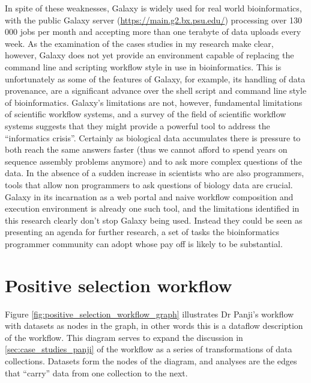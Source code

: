 \documentclass[a4paper,10pt]{scrreprt} \usepackage[utf8]{inputenc}
\begin{document}
In spite of these weaknesses, Galaxy is widely used for real world bioinformatics, with the public Galaxy server (\url{https://main.g2.bx.psu.edu/}) processing over 130 000 jobs per month and accepting more than one terabyte of data uploads every week. \cite{nekrutenko_introduction_2011} As the examination of the cases studies in my research make clear, however, Galaxy does not yet provide an environment capable of replacing the command line and scripting workflow style in use in bioinformatics. This is unfortunately as some of the features of Galaxy, for example, its handling of data provenance, are a significant advance over the shell script and command line style of bioinformatics. Galaxy's limitations are not, however, fundamental limitations of scientific workflow systems, and a survey of the field of scientific workflow systems suggests that they might provide a powerful tool to address the ``informatics crisis''. Certainly as biological data accumulates there is pressure to both reach the same answers 
faster (thus we cannot afford to spend years on sequence assembly problems anymore) and to ask more complex questions of the data. In the absence of a sudden increase in scientists who are also programmers, tools that allow non programmers to ask questions of biology data are crucial. Galaxy in its incarnation as a web portal and naive workflow composition and execution environment is already one such tool, and the limitations identified in this research clearly don't stop Galaxy being used. Instead they could be seen as presenting an agenda for further research, a set of tasks the bioinformatics programmer community can adopt whose pay off is likely to be substantial.

\printglossary

\cleardoublepage
{}
{}


\appendix
\appendixpage
\addappheadtotoc


\chapter{Positive selection workflow}

\label{sec:positive_selection_workflow_analyses_graph}

Figure \ref{fig:positive_selection_workflow_graph} illustrates Dr Panji's workflow with datasets as
nodes in the graph, in other words this is a \gls{dataflow} description of the workflow. This diagram
serves to expand the discussion in \ref{sec:case_studies_panji} of the workflow as a series of transformations
of data collections. Datasets form the nodes of the diagram, and analyses are the edges that ``carry''
data from one collection to the next.
\end{document}
